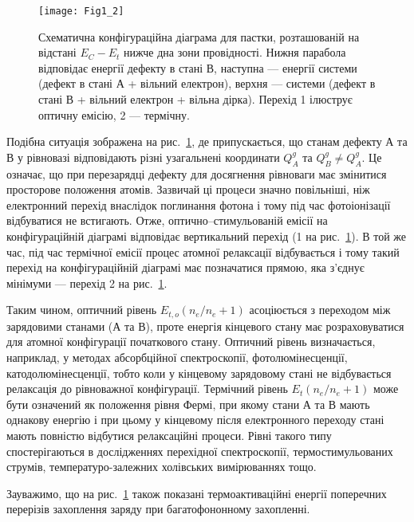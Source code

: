 \begin{figure}[t]
\center
\vspace{-5mm}
\texttt{[image: Fig1\_2]}
\vspace{-3mm}
\caption{Схематична конфігураційна діаграма для пастки,
розташованій на відстані $E_C-E_{t}$ нижче дна зони провідності.
Нижня парабола відповідає енергії дефекту в стані В,
наступна --- енергії системи (дефект в стані А + вільний електрон),
верхня --- системи (дефект в стані В + вільний електрон + вільна дірка). %
Перехід 1 ілюструє оптичну емісію, 2 --- термічну.}
\vspace{-3mm}
\label{F12}
\end{figure}

Подібна ситуація зображена на рис.~\ref{F12},
де припускається, що станам дефекту А та В у рівновазі
відповідають різні узагальнені координати $Q_A^g$ та $Q_B^g\neq Q_A^g$.
Це означає, що при перезарядці дефекту для досягнення рівноваги
має змінитися просторове положення атомів.
Зазвичай ці процеси значно повільніші, ніж електронний перехід
внаслідок поглинання фотона і тому під час фотоіонізації відбуватися не встигають.
Отже, оптично--стимульованій емісії на конфігураційній діаграмі відповідає вертикальний перехід
(1 на рис.~\ref{F12}).
В той же час, під час термічної емісії процес атомної релаксації  відбувається і тому
такий перехід на конфігураційній діаграмі має позначатися прямою, яка з'єднує мінімуми ---
перехід 2 на рис.~\ref{F12}.

Таким чином, оптичний рівень $E_{t,o}(n_e/n_e+1)$ асоціюється
з переходом між зарядовими станами (А та В), проте енергія кінцевого
стану має розраховуватися для атомної конфігурації початкового стану.
Оптичний рівень визначається, наприклад, у методах абсорбційної спектроскопії,
фотолюмінесценції, катодолюмінесценції, тобто коли у кінцевому
зарядовому стані не відбувається релаксація до рівноважної конфігурації.
Термічний рівень $E_{t}(n_e/n_e+1)$ може бути означений як положення рівня Фермі,
при якому стани А та В мають однакову енергію і при цьому у кінцевому після електронного переходу стані
мають повністю відбутися релаксаційні процеси.
Рівні такого типу спостерігаються в дослідженнях перехідної спектроскопії,
термостимульованих струмів, температуро-залежних холівських вимірюваннях тощо.

Зауважимо, що на рис.~\ref{F12} також показані термоактиваційні енергії поперечних перерізів захоплення
заряду при багатофононному захопленні.

